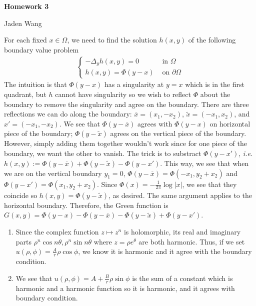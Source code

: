 \documentclass[12pt]{article}
\begin{document}
\centerline {\textsf{\textbf{\LARGE{Homework 3}}}}
\centerline {Jaden Wang}
\vspace{.15in}
\begin{problem}[1]
For each fixed $ x \in \Omega$,  we need to find the solution $ h(x,y)$ of the following boundary value problem
\begin{align*}
\begin{cases}
	-\Delta_y h(x,y) =0 &  \text{ in }  \Omega\\
	h(x,y) = \Phi(y-x) & \text{ on }  \partial \Omega
\end{cases}
\end{align*}
The intuition is that $ \Phi(y-x)$ has a singularity at $ y=x$ which is in the first quadrant, but $ h$ cannot have singularity so we wish to reflect $ \Phi$ about the boundary to remove the singularity and agree on the boundary. There are three reflections we can do along the boundary: $ \overline{x} = (x_1,-x_2)$, $ \widetilde{ x} = (-x_1,x_2)$, and $ x' = (-x_1,-x_2)$. We see that $ \Phi(y-\overline{x})$ agrees with $ \Phi(y-x)$ on horizontal piece of the boundary; $ \Phi(y-\widetilde{ x})$ agrees on the vertical piece of the boundary. However, simply adding them together wouldn't work since for one piece of the boundary, we want the other to vanish. The trick is to substract $ \Phi(y-x')$, \emph{i.e.} $ h(x,y):= \Phi(y-\overline{x})+\Phi(y-\widetilde{ x})-\Phi(y-x')$. This way, we see that when we are on the vertical boundary $ y_1=0$, $ \Phi(y-\overline{x}) = \Phi(-x_1,y_2+x_2)$ and $ \Phi(y-x') = \Phi(x_1,y_2+x_2)$. Since $ \Phi(x) = -\frac{1}{2 \pi} \log |x|$, we see that they coincide so $ h(x,y) = \Phi(y-\widetilde{ x})$, as desired. The same argument applies to the horizontal boundary. Therefore, the Green function is $ G(x,y) = \Phi(y-x)-\Phi(y-\overline{x})-\Phi(y-\widetilde{ x}) + \Phi(y-x')$.
\end{problem}
\begin{problem}[2]
\begin{enumerate}[label=(\alph*)]
	\item Since the complex function $z \mapsto  z^{n}$ is holomorphic, its real and imaginary parts $ \rho^{n} \cos n \theta, \rho^{n} \sin n \theta $ where $ z = \rho e^{\theta}$ are both harmonic. Thus, if we set $u(\rho,\phi) =\frac{A}{r} \rho \cos \phi$, we know it is harmonic and it agree with the boundary condition.
	\item We see that $u(\rho,\phi)= A+ \frac{B}{r} \rho \sin \phi$ is the sum of a constant which is harmonic and a harmonic function so it is harmonic, and it agrees with boundary condition.
\end{enumerate}
\end{problem}
\end{document}

